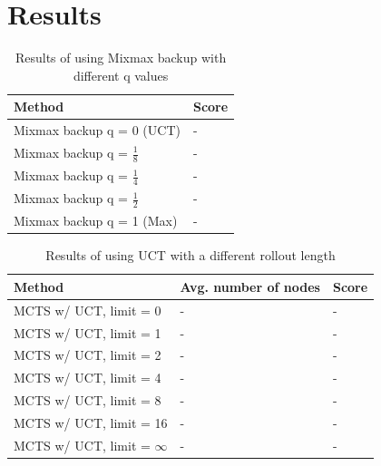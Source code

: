 \documentclass[10pt,a4paper]{article}
\begin{document}
\section{Results}
\renewcommand{\arraystretch}{1.5}
\begin{table}[h]
	\centering
	\begin{tabular}{| l | l |}
		\hline
		\textbf{Method} & \textbf{Score} 		\\ \hline
		Mixmax backup q = 0 (UCT) 			& - \\ \hline
		Mixmax backup q = $\frac{1}{8}$	& - \\ \hline
		Mixmax backup q = $\frac{1}{4}$	& - \\ \hline
		Mixmax backup q = $\frac{1}{2}$	& - \\ \hline
		Mixmax backup q = 1 (Max)			& - \\ \hline
	\end{tabular}
	\caption{Results of using Mixmax backup with different q values}
	\label{tab:mixmax_results}
\end{table}

\begin{table}[h]
	\centering
	\begin{tabular}{| l | l | l |}
		\hline
		\textbf{Method} & \textbf{Avg. number of nodes} & \textbf{Score} \\ \hline
		MCTS w/ UCT, limit = 0			& - & - \\ \hline
		MCTS w/ UCT, limit = 1			& - & - \\ \hline
		MCTS w/ UCT, limit = 2			& - & - \\ \hline
		MCTS w/ UCT, limit = 4			& - & - \\ \hline
		MCTS w/ UCT, limit = 8			& - & - \\ \hline
		MCTS w/ UCT, limit = 16			& - & - \\ \hline
		MCTS w/ UCT, limit = $\infty$	& - & - \\ \hline
	\end{tabular}
	\caption{Results of using UCT with a different rollout length}
	\label{tab:uct_results}
\end{table}
\end{document}
